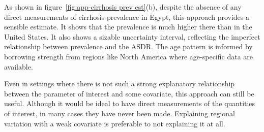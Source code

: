 As shown in figure~\ref{fig:app-cirrhosis prev est}(b),
despite the absence of any direct measurements of cirrhosis prevalence
in Egypt, this approach provides a sensible estimate.  It shows that
the prevalence is much higher there than in the United States.  It
also shows a sizable uncertainty interval, reflecting the imperfect
relationship between prevalence and the ASDR.  The age pattern is informed
by borrowing strength from regions like North America where
age-specific data are available.

Even in settings where there is not such a strong explanatory
relationship between the parameter of interest and some covariate,
this approach can still be useful.  Although it would be ideal to have
direct measurements of the quantities of interest, in many cases they
have never been made.  Explaining regional variation with a weak
covariate is preferable to not explaining it at all.
